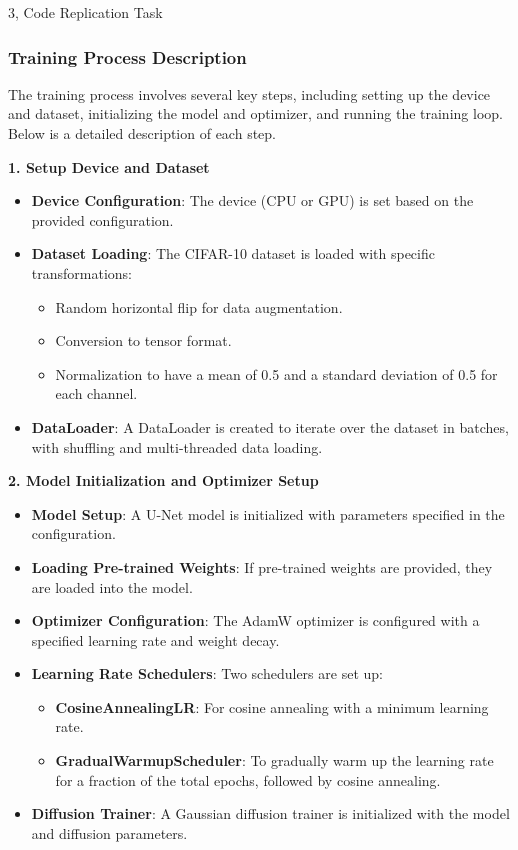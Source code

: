 \documentclass[10pt,a4paper]{article}
\begin{document}
\begin{task}{3, Code Replication Task}
\subsubsection{Training Process Description}

The training process involves several key steps, including setting up the device and dataset, initializing the model and optimizer, and running the training loop. Below is a detailed description of each step.

\textbf{1. Setup Device and Dataset}

\begin{itemize}
    \item \textbf{Device Configuration}: The device (CPU or GPU) is set based on the provided configuration.
    \item \textbf{Dataset Loading}: The CIFAR-10 dataset is loaded with specific transformations:
    \begin{itemize}
        \item Random horizontal flip for data augmentation.
        \item Conversion to tensor format.
        \item Normalization to have a mean of 0.5 and a standard deviation of 0.5 for each channel.
    \end{itemize}
    \item \textbf{DataLoader}: A DataLoader is created to iterate over the dataset in batches, with shuffling and multi-threaded data loading.
\end{itemize}

\textbf{2. Model Initialization and Optimizer Setup}

\begin{itemize}
    \item \textbf{Model Setup}: A U-Net model is initialized with parameters specified in the configuration.
    \item \textbf{Loading Pre-trained Weights}: If pre-trained weights are provided, they are loaded into the model.
    \item \textbf{Optimizer Configuration}: The AdamW optimizer is configured with a specified learning rate and weight decay.
    \item \textbf{Learning Rate Schedulers}: Two schedulers are set up:
    \begin{itemize}
        \item \textbf{CosineAnnealingLR}: For cosine annealing with a minimum learning rate.
        \item \textbf{GradualWarmupScheduler}: To gradually warm up the learning rate for a fraction of the total epochs, followed by cosine annealing.
    \end{itemize}
    \item \textbf{Diffusion Trainer}: A Gaussian diffusion trainer is initialized with the model and diffusion parameters.
\end{itemize}


\end{task}
\end{document}
